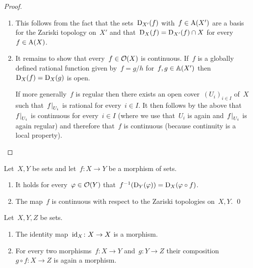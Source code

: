 \begin{proof}
  \leavevmode
  \begin{enumerate}
    \item
      This follows from the fact that the sets~$\operatorname{D}_{X'}(f)$ with~$f \in \operatorname{A}(X')$ are a basis for the Zariski topology on~$X'$ and that~$\operatorname{D}_X(f) = \operatorname{D}_{X'}(f) \cap X$ for every~$f \in \operatorname{A}(X)$.
    \item
      It remains to show that every~$f \in \mathcal{O}(X)$ is continuous.
      If~$f$ is a globally defined rational function given by~$f = g/h$ for~$f, g \in \mathbb{A}(X')$ then~$\operatorname{D}_X(f) = \operatorname{D}_X(g)$ is open.
      
      If more generally~$f$ is regular then there exists an open cover~$(U_i)_{i \in I}$ of~$X$ such that~$\restrict{f}{U_i}$ is rational for every~$i \in I$.
      It then follows by the above that~$\restrict{f}{U_i}$ is continuous for every~$i \in I$ (where we use that~$U_i$ is again {\qaffine} and~$\restrict{f}{U_i}$ is again regular) and therefore that~$f$ is continuous (because continuity is a local property).
    \qedhere
  \end{enumerate}
\end{proof}


\begin{corollary}
  Let~$X,Y$ be {\qaffine} sets and let~$f \colon X \to Y$ be a morphism of {\qaffine} sets.
\ \begin{enumerate}
    \item
      It holds for every~$\varphi \in \mathcal{O}(Y)$ that~$f^{-1}(\operatorname{D}_Y(\varphi)) = \operatorname{D}_X(\varphi \circ f)$.
    \item
      The map~$f$ is continuous with respect to the Zariski topologies on~$X,Y$.
    \qed
  \end{enumerate}
\end{corollary}


\begin{lemma}
  Let~$X, Y, Z$ be {\qaffine} sets.
  \begin{enumerate}
    \item
      The identity map~$\operatorname{id}_X \colon X \to X$ is a morphism.
    \item
      For every two morphisms~$f \colon X \to Y$ and~$g \colon Y \to Z$ their composition~$g \circ f \colon X \to Z$ is again a morphism.
  \end{enumerate}
\end{lemma}



